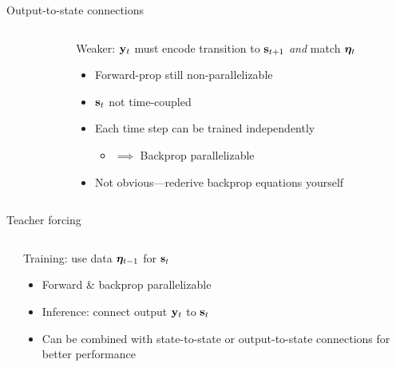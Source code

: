 \begin{frame}{Output-to-state connections}
    \begin{columns}
        \begin{column}{0.47\textwidth}
            
        \end{column}

        \begin{column}{0.53\textwidth}
            \begin{block}{}
                Weaker: $\mathbf{y}_t$ must encode transition to $\mathbf{s}_{t+1}$ \emph{and} match $\bm{\eta}_t$
            \end{block}

            \begin{itemize}
                \item Forward-prop still non-parallelizable
                \item $\mathbf{s}_t$ not time-coupled
                \item Each time step can be trained independently
                \begin{itemize}
                    \item $\implies$ Backprop parallelizable
                \end{itemize}
                \item Not obvious---rederive backprop equations yourself \smiley
            \end{itemize}
        \end{column}
    \end{columns}
\end{frame}

\begin{frame}{Teacher forcing}
    \begin{columns}
        \begin{column}{0.47\textwidth}
            
        \end{column}

        \begin{column}{0.53\textwidth}
            \begin{block}{}
                Training: use data $\bm{\eta}_{t-1}$ for $\mathbf{s}_t$
            \end{block}

            \begin{itemize}[<.->]
                \item<+-> Forward \& backprop parallelizable
                \item<+-> Inference: connect output $\mathbf{y}_t$ to $\mathbf{s}_t$
                \item Can be combined with state-to-state or output-to-state connections for better performance
            \end{itemize}
        \end{column}
    \end{columns}
\end{frame}

